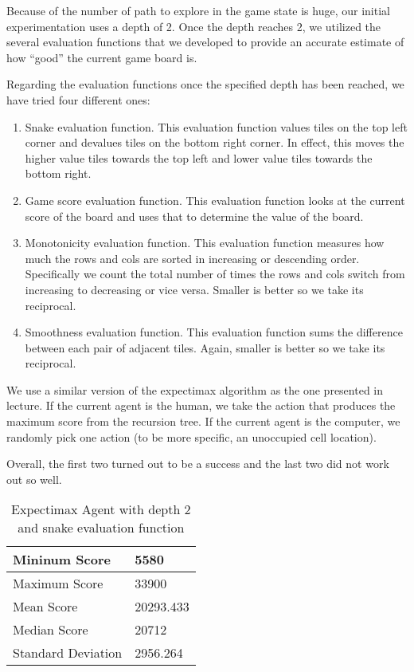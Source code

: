 \documentclass[9pt,twocolumn]{article}
\begin{document}
Because of the number of path to explore in the game state is huge, our initial experimentation uses a depth of 2. Once the depth reaches 2, we utilized the several evaluation functions that we developed to provide an accurate estimate of how “good” the current game board is.

Regarding the evaluation functions once the specified depth has been reached, we have tried four different ones:

\begin{enumerate}

\item Snake evaluation function. This evaluation function values tiles on the top left corner and devalues tiles on the bottom right corner. In effect, this moves the higher value tiles towards the top left and lower value tiles towards the bottom right.
\item Game score evaluation function. This evaluation function looks at the current score of the board and uses that to determine the value of the board.
\item Monotonicity evaluation function. This evaluation function measures how much the rows and cols are sorted in increasing or descending order. Specifically we count the total number of times the rows and cols switch from increasing to decreasing or vice versa. Smaller is better so we take its reciprocal.
\item Smoothness evaluation function. This evaluation function sums the difference between each pair of adjacent tiles. Again, smaller is better so we take its reciprocal.

\end{enumerate}

We use a similar version of the expectimax algorithm as the one presented in lecture. If the current agent is the human, we take the action that produces the maximum score from the recursion tree. If the current agent is the computer, we randomly pick one action (to be more specific, an unoccupied cell location).

Overall, the first two turned out to be a success and the last two did not work out so well.

\begin{table}[!htbp]

\centering

\begin{tabular}{|l|l|}
\hline
Mininum Score      & 5580 \\ \hline
Maximum Score      & 33900 \\ \hline
Mean Score         & 20293.433 \\ \hline
Median Score       & 20712 \\ \hline
Standard Deviation & 2956.264 \\ \hline
\end{tabular}

\caption{Expectimax Agent with depth 2 and snake evaluation function}

\end{table}
\end{document}
